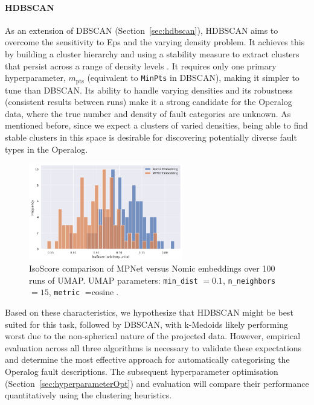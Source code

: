 \documentclass[10pt,oneside]{report}
\begin{document}
\paragraph{HDBSCAN} As an extension of DBSCAN (Section~\ref{sec:hdbscan}), HDBSCAN aims to overcome the sensitivity to Eps and the varying density problem. It achieves this by building a cluster hierarchy and using a stability measure to extract clusters that persist across a range of density levels \cite{campello2013density}. It requires only one primary hyperparameter, $m_{\text{pts}}$ (equivalent to \texttt{MinPts} in DBSCAN), making it simpler to tune than DBSCAN. Its ability to handle varying densities and its robustness (consistent results between runs) make it a strong candidate for the Operalog data, where the true number and density of fault categories are unknown. As mentioned before, since we expect a clusters of varied densities, being able to find stable clusters in this space is desirable for discovering potentially diverse fault types in the Operalog.

\begin{figure}[htbp]
    \centering
    \includegraphics[width=0.6\textwidth]{./images/isoscore.png}
    \caption{IsoScore comparison of MPNet versus Nomic embeddings over 100 runs of UMAP. UMAP parameters: \texttt{min\_dist} $=0.1$, \texttt{n\_neighbors} $=15$, \texttt{metric} $= \text{cosine}$.}\label{fig:isoscore}
\end{figure}

Based on these characteristics, we hypothesize that HDBSCAN might be best suited for this task, followed by DBSCAN, with k-Medoids likely performing worst due to the non-spherical nature of the projected data. However, empirical evaluation across all three algorithms is necessary to validate these expectations and determine the most effective approach for automatically categorising the Operalog fault descriptions. The subsequent hyperparameter optimisation (Section~\ref{sec:hyperparameterOpt}) and evaluation will compare their performance quantitatively using the clustering heuristics.
\end{document}
